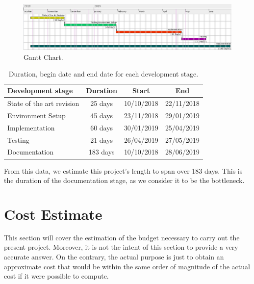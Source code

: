 \begin{figure}
  \centering
  \includegraphics[width=\linewidth]{imagenes/TimeCost/Gantt_chart.png}
  \caption{Gantt Chart.}
  \label{fig:gantt_chart}
\end{figure}

\begin{table}
    \centering
    \caption{Duration, begin date and end date for each development stage.}
    \vspace{0.1 cm}
    \begin{tabular}{l c c c}
    \hline
    \rowcolor{lightgray}
    \textbf{Development stage}           &\textbf{Duration} &\textbf{Start}   &\textbf{End}            \\ \hline
    State of the art revision            & 25 days          & 10/10/2018      & 22/11/2018             \\ \hline 
    Environment Setup                    & 45 days          & 23/11/2018      & 29/01/2019             \\ \hline
    Implementation			             & 60 days          & 30/01/2019      & 25/04/2019             \\ \hline
    Testing          		             & 21 days          & 26/04/2019      & 27/05/2019             \\ \hline
    Documentation			             & 183 days         & 10/10/2018      & 28/06/2019             \\ \hline
    \end{tabular}
    \label{tab:gantt_dates}
\end{table}

From this data, we estimate this project's length to span over 183 days. This is the duration of the documentation stage, as we consider it to be the bottleneck.

\section{Cost Estimate}
This section will cover the estimation of the budget necessary to carry out the present project. Moreover, it is not the intent of this section to provide a very accurate answer. On the contrary, the actual purpose is just to obtain an approximate cost that would be within the same order of magnitude of the actual cost if it were possible to compute.

